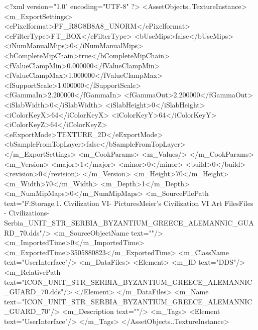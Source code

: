 <?xml version="1.0" encoding="UTF-8" ?>
<AssetObjects..TextureInstance>
	<m_ExportSettings>
		<ePixelformat>PF_R8G8B8A8_UNORM</ePixelformat>
		<eFilterType>FT_BOX</eFilterType>
		<bUseMips>false</bUseMips>
		<iNumManualMips>0</iNumManualMips>
		<bCompleteMipChain>true</bCompleteMipChain>
		<fValueClampMin>0.000000</fValueClampMin>
		<fValueClampMax>1.000000</fValueClampMax>
		<fSupportScale>1.000000</fSupportScale>
		<fGammaIn>2.200000</fGammaIn>
		<fGammaOut>2.200000</fGammaOut>
		<iSlabWidth>0</iSlabWidth>
		<iSlabHeight>0</iSlabHeight>
		<iColorKeyX>64</iColorKeyX>
		<iColorKeyY>64</iColorKeyY>
		<iColorKeyZ>64</iColorKeyZ>
		<eExportMode>TEXTURE_2D</eExportMode>
		<bSampleFromTopLayer>false</bSampleFromTopLayer>
	</m_ExportSettings>
	<m_CookParams>
		<m_Values/>
	</m_CookParams>
	<m_Version>
		<major>1</major>
		<minor>0</minor>
		<build>0</build>
		<revision>0</revision>
	</m_Version>
	<m_Height>70</m_Height>
	<m_Width>70</m_Width>
	<m_Depth>1</m_Depth>
	<m_NumMipMaps>0</m_NumMipMaps>
	<m_SourceFilePath text="F:\Mod Storage\2.1. Civilization VI\Mods\Archive - Pictures\Sid Meier's Civilization VI Art Files\Art Files - Civilizations\Civilization - Serbia\ICON_UNIT_STR_SERBIA_BYZANTIUM_GREECE_ALEMANNIC_GUARD_70.dds"/>
	<m_SourceObjectName text=""/>
	<m_ImportedTime>0</m_ImportedTime>
	<m_ExportedTime>3505880823</m_ExportedTime>
	<m_ClassName text="UserInterface"/>
	<m_DataFiles>
		<Element>
			<m_ID text="DDS"/>
			<m_RelativePath text="ICON_UNIT_STR_SERBIA_BYZANTIUM_GREECE_ALEMANNIC_GUARD_70.dds"/>
		</Element>
	</m_DataFiles>
	<m_Name text="ICON_UNIT_STR_SERBIA_BYZANTIUM_GREECE_ALEMANNIC_GUARD_70"/>
	<m_Description text=""/>
	<m_Tags>
		<Element text="UserInterface"/>
	</m_Tags>
</AssetObjects..TextureInstance>

